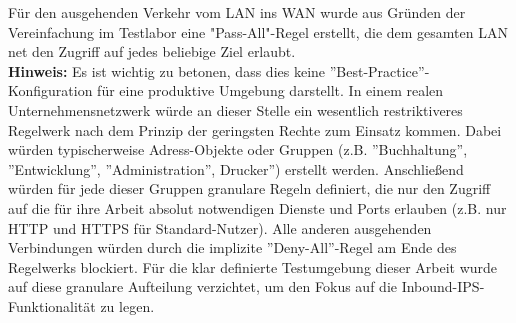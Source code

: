 Für den ausgehenden Verkehr vom LAN ins WAN wurde aus Gründen der Vereinfachung im Testlabor eine "Pass-All"-Regel erstellt, die dem gesamten LAN net den Zugriff auf jedes beliebige Ziel erlaubt.\\

\textbf{Hinweis:}
Es ist wichtig zu betonen, dass dies keine ''Best-Practice''-Konfiguration für eine produktive Umgebung darstellt. In einem realen Unternehmensnetzwerk würde an dieser Stelle ein wesentlich restriktiveres Regelwerk nach dem Prinzip der geringsten Rechte zum Einsatz kommen. Dabei würden typischerweise Adress-Objekte oder Gruppen (z.B. ''Buchhaltung'', ''Entwicklung'', ''Administration'', Drucker'') erstellt werden. Anschließend würden für jede dieser Gruppen granulare Regeln definiert, die nur den Zugriff auf die für ihre Arbeit absolut notwendigen Dienste und Ports erlauben (z.B. nur HTTP und HTTPS für Standard-Nutzer). Alle anderen ausgehenden Verbindungen würden durch die implizite ''Deny-All''-Regel am Ende des Regelwerks blockiert. Für die klar definierte Testumgebung dieser Arbeit wurde auf diese granulare Aufteilung verzichtet, um den Fokus auf die Inbound-IPS-Funktionalität zu legen.